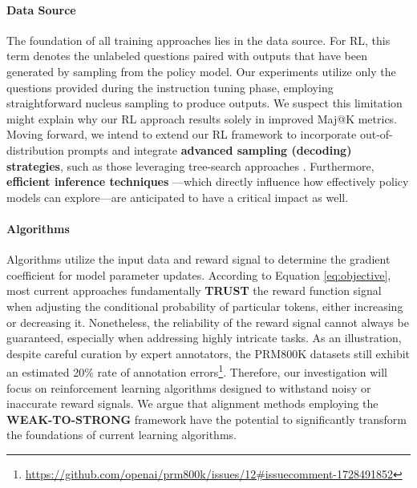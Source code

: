\begin{itemize}[topsep=0pt]
\paragraph{Data Source} The foundation of all training approaches lies in the data source. For RL, this term denotes the unlabeled questions paired with outputs that have been generated by sampling from the policy model. Our experiments utilize only the questions provided during the instruction tuning phase, employing straightforward nucleus sampling to produce outputs. We suspect this limitation might explain why our RL approach results solely in improved Maj@K metrics. Moving forward, we intend to extend our RL framework to incorporate out-of-distribution prompts and integrate \textbf{advanced sampling (decoding) strategies}, such as those leveraging tree-search approaches \citep{yao2023tree}. Furthermore, \textbf{efficient inference techniques} \citep{xia-etal-2023-speculative,leviathan2023fast,kwon2023efficient,xia2024unlocking}—which directly influence how effectively policy models can explore—are anticipated to have a critical impact as well.

\paragraph{Algorithms} Algorithms utilize the input data and reward signal to determine the gradient coefficient for model parameter updates. According to Equation \ref{eq:objective}, most current approaches fundamentally \textbf{TRUST} the reward function signal when adjusting the conditional probability of particular tokens, either increasing or decreasing it. Nonetheless, the reliability of the reward signal cannot always be guaranteed, especially when addressing highly intricate tasks. As an illustration, despite careful curation by expert annotators, the PRM800K datasets \citep{lightman2023let} still exhibit an estimated 20\% rate of annotation errors\footnote{\url{https://github.com/openai/prm800k/issues/12\#issuecomment-1728491852}}. Therefore, our investigation will focus on reinforcement learning algorithms designed to withstand noisy or inaccurate reward signals. We argue that alignment methods employing the \textbf{WEAK-TO-STRONG} framework \citep{burns2023weak} have the potential to significantly transform the foundations of current learning algorithms.


\end{itemize}
